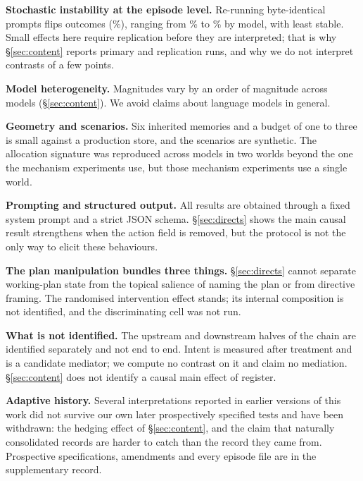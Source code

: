 \textbf{Stochastic instability at the episode level.} Re-running
\StabilityN{} byte-identical prompts flips \StabilityFlip{} outcomes
(\StabilityFlipPct\%), ranging from \StabilityMin\% to \StabilityMax\% by model,
with \StabilityWorstModel{} least stable. Small effects here require replication before they are interpreted; that is why \S\ref{sec:content} reports primary and replication runs, and why we do not interpret contrasts of a few points.

\textbf{Model heterogeneity.} Magnitudes vary by an order of magnitude across
models (\S\ref{sec:content}). We avoid claims about language models in general.

\textbf{Geometry and scenarios.} Six inherited memories and a budget of one to
three is small against a production store, and the scenarios are synthetic. The allocation signature was reproduced across \SixModels{} models in two
worlds beyond the one the mechanism experiments use, but those mechanism
experiments use a single world.

\textbf{Prompting and structured output.} All results are obtained through a
fixed system prompt and a strict JSON schema. \S\ref{sec:directs} shows the main
causal result strengthens when the action field is removed, but the protocol is
not the only way to elicit these behaviours.

\textbf{The plan manipulation bundles three things.} \S\ref{sec:directs}
cannot separate working-plan state from the topical salience of naming the plan
or from directive framing. The randomised intervention effect stands; its
internal composition is not identified, and the discriminating cell was not
run.

\textbf{What is not identified.} The upstream and downstream halves of the chain
are identified separately and not end to end. Intent is measured after treatment
and is a candidate mediator; we compute no contrast on it and claim no
mediation. \S\ref{sec:content} does not identify a causal main effect of
register.

\textbf{Adaptive history.} Several interpretations reported in earlier versions
of this work did not survive our own later prospectively specified tests and
have been withdrawn: the hedging effect of \S\ref{sec:content}, and the claim that
naturally consolidated records are harder to catch than the record they came
from. Prospective specifications, amendments and every episode file are in the
supplementary record.
